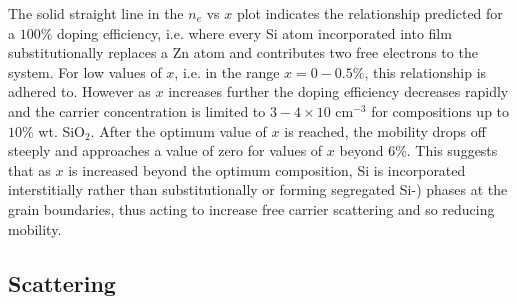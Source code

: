 \documentclass[aps,prl,preprint,showpacs,showkeys, linenumbers]{revtex4-1}
\begin{document}
The solid straight line in the $n_e$ vs $x$ plot indicates the relationship predicted for  a $100\%$ doping efficiency, i.e. where every Si atom incorporated into film substitutionally replaces a Zn atom and contributes two free electrons to the system. For low values of $x$, i.e. in the range $x=0 - 0.5\%$, this relationship is adhered to. However as $x$ increases further the doping efficiency decreases rapidly and the carrier concentration is limited to $3-4\times10$ cm$^{-3}$ for compositions up to $10\%$ wt. SiO$_{2}$. After the optimum value of $x$ is reached, the mobility drops off steeply and approaches a value of zero for values of $x$ beyond $6\%$. This suggests that as $x$ is increased beyond the optimum composition, Si is incorporated interstitially rather than substitutionally or forming segregated Si-) phases at the grain boundaries, thus acting to increase free carrier scattering and so reducing mobility.



\subsection{Scattering}
\label{sec:2.4}
\end{document}
